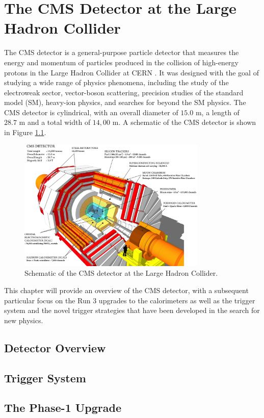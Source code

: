 \chapter{The CMS Detector at the Large Hadron Collider}

The CMS detector is a general-purpose particle detector that measures the energy and momentum of particles produced in the collision of high-energy protons in the Large Hadron Collider at CERN \cite{collaborationCMSExperimentCERN2008}. It was designed with the goal of studying a wide range of physics phenomena, including the study of the electroweak sector, vector-boson scattering, precision studies of the standard model (SM), heavy-ion physics, and searches for beyond the SM physics. The CMS detector is cylindrical, with an overall diameter of $15.0 \text{ m}$, a length of $28.7 \text{ m}$ and a total width of $14,00\text{ m}$. A schematic of the CMS detector is shown in Figure \ref{fig:cms_detector}.

\begin{figure}[ht]
	\centering
	\includegraphics[width=0.8\textwidth]{images/cms_detector.png}
	\caption{Schematic of the CMS detector at the Large Hadron Collider.}
	\label{fig:cms_detector}
\end{figure}

This chapter will provide an overview of the CMS detector, with a subsequent particular focus on the Run 3 upgrades to the calorimeters as well as the trigger system and the novel trigger strategies that have been developed in the search for new physics.

\section{Detector Overview}


\section{Trigger System}

\section{The Phase-1 Upgrade}
